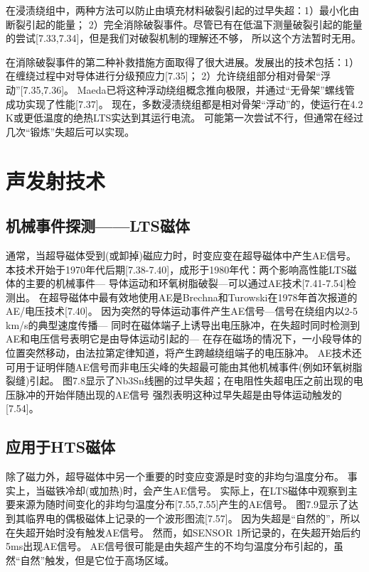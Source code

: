 在浸渍绕组中，两种方法可以防止由填充材料破裂引起的过早失超：1）最小化由断裂引起的能量；
2）完全消除破裂事件。尽管已有在低温下测量破裂引起的能量的尝试[7.33,7.34]，但是我们对破裂机制的理解还不够，
所以这个方法暂时无用。

在消除破裂事件的第二种补救措施方面取得了很大进展。发展出的技术包括：1）在缠绕过程中对导体进行分级预应力[7.35]；
2）允许绕组部分相对骨架“浮动”[7.35,7.36]。
 Maeda已将这种浮动绕组概念推向极限，并通过“无骨架”螺线管成功实现了性能[7.37]。
 现在，多数浸渍绕组都是相对骨架“浮动”的，使运行在4.2 K或更低温度的绝热LTS实达到其运行电流。
 可能第一次尝试不行，但通常在经过几次“锻炼”失超后可以实现。


\section{声发射技术}
\subsection{机械事件探测——LTS磁体}
通常，当超导磁体受到(或卸掉)磁应力时，时变应变在超导磁体中产生AE信号。
本技术开始于1970年代后期[7.38-7.40]，成形于1980年代：两个影响高性能LTS磁体的主要的机械事件---
导体运动和环氧树脂破裂---可以通过AE技术[7.41-7.54]检测出。
在超导磁体中最有效地使用AE是Brechna和Turowski在1978年首次报道的AE/电压技术[7.40]。
因为突然的导体运动事件产生AE信号---信号在绕组内以2-5 km/s的典型速度传播---
同时在磁体端子上诱导出电压脉冲，在失超时同时检测到AE和电压信号表明它是由导体运动引起的---
在存在磁场的情况下，一小段导体的位置突然移动，由法拉第定律知道，将产生跨越绕组端子的电压脉冲。 
AE技术还可用于证明伴随AE信号而非电压尖峰的失超最可能由其他机械事件(例如环氧树脂裂缝)引起。
图7.8显示了Nb3Sn线圈的过早失超；在电阻性失超电压之前出现的电压脉冲的开始伴随出现的AE信号
强烈表明这种过早失超是由导体运动触发的[7.54]。

\subsection{应用于HTS磁体}
除了磁力外，超导磁体中另一个重要的时变应变源是时变的非均匀温度分布。
事实上，当磁铁冷却(或加热)时，会产生AE信号。
实际上，在LTS磁体中观察到主要来源为随时间变化的非均匀温度分布[7.55,7.55]产生的AE信号。
图7.9显示了达到其临界电的偶极磁体上记录的一个波形图流[7.57]。
因为失超是“自然的”，所以在失超开始时没有触发AE信号。
然而，如SENSOR 1所记录的，在失超开始后约5ms出现AE信号。
AE信号很可能是由失超产生的不均匀温度分布引起的，虽然“自然”触发，但是它位于高场区域。

